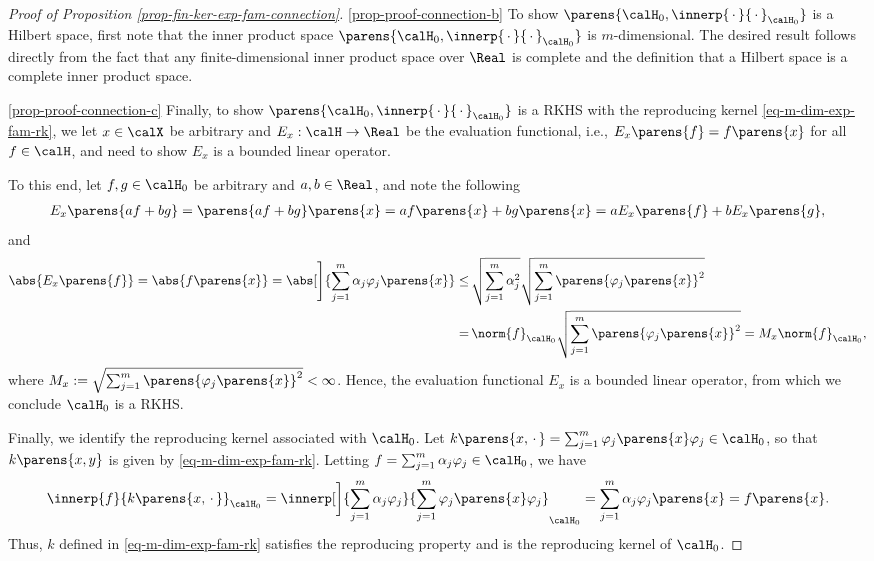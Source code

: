 \documentclass[12pt]{article}
\theoremstyle{definition}
\theoremstyle{theorem}
\theoremstyle{remark}
\begin{document}
\begin{proof}[Proof of Proposition \ref{prop-fin-ker-exp-fam-connection}]
	\ref{prop-proof-connection-b} To show $\parens{\calH_0, \innerp{\,\cdot\,}{\,\cdot\,}_{\calH_0}}$ is a Hilbert space, first note that the inner product space $\parens{\calH_0, \innerp{\,\cdot\,}{\,\cdot\,}_{\calH_0}}$ is $m$-dimensional. The desired result follows directly from the fact that any finite-dimensional inner product space over $\Real$ is complete and the definition that a Hilbert space is a complete inner product space. 
	
	\ref{prop-proof-connection-c} Finally, to show $\parens{\calH_0, \innerp{\,\cdot\,}{\,\cdot\,}_{\calH_0}}$ is a RKHS with the reproducing kernel \eqref{eq-m-dim-exp-fam-rk}, we let $x \in \calX$ be arbitrary and $E_x: \calH \to \Real$ be the evaluation functional, i.e., $E_x \parens{f} = f \parens{x}$ for all $f \in \calH$, and need to show $E_x$ is a bounded linear operator. 
	
	To this end, let $f, g \in \calH_0$ be arbitrary and $a, b \in \Real$, and note the following 
	\begin{align*}
		E_x \parens{a f + b g} = \parens{a f + b g} \parens{x} = a f \parens{x} + b g \parens{x} = a E_x \parens{f} + b E_x \parens{g}, 
	\end{align*}
	and 
	\begin{align*}
		\abs{E_x \parens{f}} = \abs{f \parens{x}} = \abs[\Bigg]{\sum_{j=1}^m \alpha_j \varphi_j \parens{x}} 
		\le & \, \sqrt{\sum_{j=1}^m \alpha_j^2} \sqrt{\sum_{j=1}^m \parens{\varphi_j \parens{x}}^2} \\ 
		= & \, \norm{f}_{\calH_0} \sqrt{\sum_{j=1}^m \parens{\varphi_j \parens{x}}^2} 
		= M_x \norm{f}_{\calH_0}, 
	\end{align*}
	where $M_x := \sqrt{\sum_{j=1}^m \parens{\varphi_j \parens{x}}^2} < \infty$. Hence, the evaluation functional $E_x$ is a bounded linear operator, from which we conclude $\calH_0$ is a RKHS. 
	
	Finally, we identify the reproducing kernel associated with $\calH_0$. Let $k \parens{x, \,\cdot\,} = \sum_{j=1}^m \varphi_j \parens{x} \varphi_j \in \calH_0$, 
	so that $k \parens{x, y}$ is given by \eqref{eq-m-dim-exp-fam-rk}. Letting $f = \sum_{j=1}^m \alpha_j \varphi_j \in \calH_0$, we have 
	\begin{align*}
		\innerp{f}{k \parens{x, \,\cdot\,}}_{\calH_0} = \innerp[\bigg]{\sum_{j=1}^m \alpha_j \varphi_j}{\sum_{j=1}^m \varphi_j \parens{x} \varphi_j}_{\calH_0} = \sum_{j=1}^m \alpha_j \varphi_j \parens{x} = f \parens{x}. 
	\end{align*}
	Thus, $k$ defined in \eqref{eq-m-dim-exp-fam-rk} satisfies the reproducing property and is the reproducing kernel of $\calH_0$. 
\end{proof}
\end{document}

